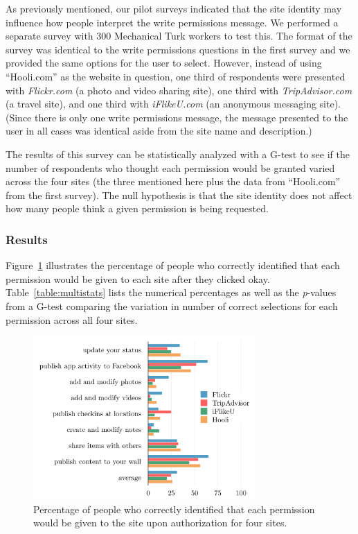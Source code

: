 \documentclass[10pt]{sig-alternate-10pt}
\begin{document}
As previously mentioned, our pilot surveys indicated that the site identity may influence how people interpret the write permissions message. We performed a separate survey with 300 Mechanical Turk workers to test this. The format of the survey was identical to the write permissions questions in the first survey and we provided the same options for the user to select. However, instead of using ``Hooli.com'' as the website in question, one third of respondents were presented with \emph{Flickr.com} (a photo and video sharing site), one third with \emph{TripAdvisor.com} (a travel site), and one third with \emph{iFlikeU.com} (an anonymous messaging site). (Since there is only one write permissions message, the message presented to the user in all cases was identical aside from the site name and description.)

The results of this survey can be statistically analyzed with a G-test to see if the number of respondents who thought each permission would be granted varied across the four sites (the three mentioned here plus the data from ``Hooli.com'' from the first survey). The null hypothesis is that the site identity does not affect how many people think a given permission is being requested.

\subsubsection{Results}

Figure~\ref{figure:multipercents} illustrates the percentage of people who correctly identified that each permission would be given to each site after they clicked okay. Table~\ref{table:multistats} lists the numerical percentages as well as the \emph{p}-values from a G-test comparing the variation in number of correct selections for each permission across all four sites.

\begin{figure}[h!]
  \centering
  \includegraphics[width=8.5cm]{multi_percents_cosn}
  \caption{Percentage of people who correctly identified that each permission would be given to the site upon authorization for four sites.}
  \label{figure:multipercents}
\end{figure}
\end{document}
